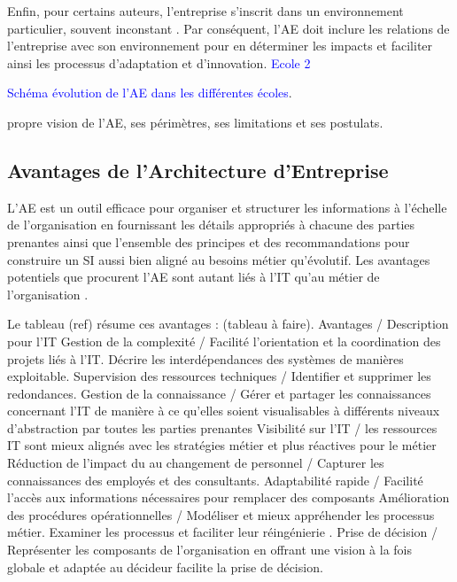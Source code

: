Enfin, pour certains auteurs, l'entreprise s'inscrit dans un environnement 
particulier, souvent inconstant \cite{lapalme2012three}. Par conséquent, l'AE 
doit inclure les relations de l'entreprise avec son environnement pour en 
déterminer les impacts et faciliter ainsi les processus d'adaptation  et 
d'innovation. \textcolor{blue}{Ecole 2}


\textcolor{blue}{Schéma évolution de l'AE dans les différentes écoles}.  



propre vision de l'AE, ses périmètres, ses limitations et ses postulats.

  
\subsection{Avantages de l'Architecture d'Entreprise}
L'AE est un outil efficace pour organiser et structurer les informations à 
l'échelle de l'organisation en fournissant les détails appropriés à chacune des 
parties prenantes ainsi que l'ensemble des principes et des recommandations pour 
construire un SI aussi bien aligné au besoins métier qu'évolutif. Les avantages 
potentiels que procurent l'AE sont autant liés à l'IT qu'au métier de 
l'organisation \cite{ross2005understanding}.

Le tableau (ref) résume ces avantages \cite{shah2007frameworks} : 
(tableau à faire). 
Avantages / Description
pour l'IT
Gestion de la complexité / Facilité l'orientation et la coordination des projets 
liés à l'IT. Décrire les interdépendances des systèmes de manières exploitable.
Supervision des ressources techniques / Identifier et supprimer les redondances.
Gestion de la connaissance /  Gérer et partager les connaissances concernant 
l'IT de manière à ce qu'elles soient visualisables à différents niveaux 
d'abstraction par toutes les parties prenantes 
Visibilité sur l'IT / les ressources IT sont mieux alignés avec les stratégies 
métier et plus réactives
pour le métier 
Réduction de l'impact du au changement de personnel / Capturer les connaissances 
des employés et des consultants. 
Adaptabilité rapide /  Facilité l'accès aux informations nécessaires pour 
remplacer des composants
Amélioration des procédures opérationnelles / Modéliser et mieux appréhender les 
processus métier. Examiner les processus et faciliter leur réingénierie  .
Prise de décision / Représenter les composants de l'organisation  en offrant une 
vision à la fois globale et adaptée au décideur facilite la prise de décision.




